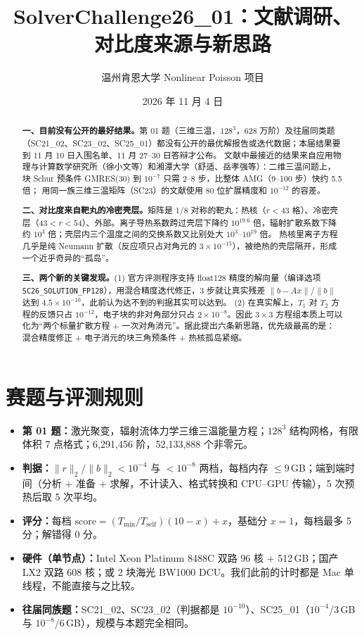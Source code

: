 \documentclass[11pt,a4paper]{ctexart}
\title{SolverChallenge26\_01：文献调研、对比度来源与新思路}
\author{温州肯恩大学 \quad Nonlinear Poisson 项目}
\date{2026 年 11 月 4 日}
\begin{document}
\maketitle

\begin{abstract}
\textbf{一、目前没有公开的最好结果。}第 01 题（三维三温，$128^3$，628 万阶）及往届同类题（SC21\_02、SC23\_02、SC25\_01）都没有公开的最优解报告或迭代数据；本届结果要到 11 月 10 日入围名单、11 月 27--30 日答辩才公布。
文献中最接近的结果来自应用物理与计算数学研究所（徐小文等）和湘潭大学（舒适、岳孝强等）：二维三温问题上，块 Schur 预条件 GMRES(30) 到 $10^{-7}$ 只需 2--8 步，比整体 AMG（9--100 步）快约 5.5 倍；
用同一族三维三温矩阵（SC23）的文献使用 80 位扩展精度和 $10^{-12}$ 的容差。

\textbf{二、对比度来自靶丸的冷密壳层。}矩阵是 1/8 对称的靶丸：热核（$r<43$ 格）、冷密壳层（$43<r<54$）、外部。离子导热系数跨过壳层下降约 $10^{19.6}$ 倍，辐射扩散系数下降约 $10^3$ 倍；壳层内三个温度之间的交换系数又比别处大 $10^{3}$--$10^{19}$ 倍。
热核里离子方程几乎是纯 Neumann 扩散（反应项只占对角元的 $3\times10^{-15}$），被绝热的壳层隔开，形成一个近乎奇异的“孤岛”。

\textbf{三、两个新的关键发现。}(1) 官方评测程序支持 float128 精度的解向量（编译选项 \texttt{SC26\_\allowbreak SOLUTION\_\allowbreak FP128}），用混合精度迭代修正，3 步就让真实残差 $\|b-Ax\|/\|b\|$ 达到 $4.5\times10^{-10}$，此前认为达不到的判据其实可以达到。
(2) 在真实解上，$T_1$ 对 $T_2$ 方程的反馈只占 $10^{-12}$，电子块的非对角部分只占 $2\times10^{-8}$。因此 $3\times3$ 方程组本质上可以化为“两个标量扩散方程 + 一次对角消元”。据此提出六条新思路，优先级最高的是：混合精度修正 + 电子消元的块三角预条件 + 热核孤岛紧缩。
\end{abstract}

\tableofcontents

\section{赛题与评测规则}
\begin{itemize}
\item \textbf{第 01 题：}激光聚变，辐射流体力学三维三温能量方程；$128^3$ 结构网格，有限体积 7 点格式；6,291,456 阶，52,133,888 个非零元。
\item \textbf{判据：}$\|r\|_2/\|b\|_2<10^{-4}$ 与 $<10^{-8}$ 两档，每档内存 $\le9$\,GB；端到端时间（分析 + 准备 + 求解，不计读入、格式转换和 CPU--GPU 传输），5 次预热后取 5 次平均。
\item \textbf{评分：}每档 $\text{score}=(T_{\min}/T_{\text{self}})(10-x)+x$，基础分 $x=1$，每档最多 5 分；解错得 0 分。
\item \textbf{硬件（单节点）：}Intel Xeon Platinum 8488C 双路 96 核 + 512\,GB；国产 LX2 双路 608 核；或 2 块海光 BW1000 DCU。我们此前的计时都是 Mac 单线程，不能直接与之比较。
\item \textbf{往届同族题：}SC21\_02、SC23\_02（判据都是 $10^{-10}$）、SC25\_01（$10^{-4}$/3\,GB 与 $10^{-8}$/6\,GB），规模与本题完全相同。
\end{itemize}
\end{document}
